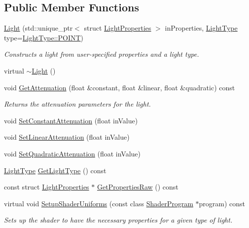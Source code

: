\subsection*{Public Member Functions}
\begin{DoxyCompactItemize}
\item
\hyperlink{class_light_adca12f0d5470bc3f2e6e77233ab3dcf1}{Light} (std\+::unique\+\_\+ptr$<$ struct \hyperlink{struct_light_properties}{Light\+Properties} $>$ in\+Properties, \hyperlink{class_light_a661d9480e01af8b1612860b9630ef5f8}{Light\+Type} type=\hyperlink{class_light_a661d9480e01af8b1612860b9630ef5f8aaebdbcb765394d25d6a604589a890f82}{Light\+Type\+::\+P\+O\+I\+NT})
\begin{DoxyCompactList}\small\item\em Constructs a light from user-\/specified properties and a light type. \end{DoxyCompactList}\item
virtual \hyperlink{class_light_ad0e59fad13bb6cfadc25b2c477e9ddc7}{$\sim$\+Light} ()
\item
void \hyperlink{class_light_acd1a8b84fbcc1ef2dc8b3bc5ecf76c7b}{Get\+Attenuation} (float \&constant, float \&linear, float \&quadratic) const
\begin{DoxyCompactList}\small\item\em Returns the attenuation parameters for the light. \end{DoxyCompactList}\item
void \hyperlink{class_light_aec7f3864e328bc9fada51fdb3e8a7c8e}{Set\+Constant\+Attenuation} (float in\+Value)
\item
void \hyperlink{class_light_aa33086ed4bff3ac95c700698b3070108}{Set\+Linear\+Attenuation} (float in\+Value)
\item
void \hyperlink{class_light_a413e0445d66742c666114dd74d689fc6}{Set\+Quadratic\+Attenuation} (float in\+Value)
\item
\hyperlink{class_light_a661d9480e01af8b1612860b9630ef5f8}{Light\+Type} \hyperlink{class_light_aaa0ba2164adcab55ed7bc1f957fa1f75}{Get\+Light\+Type} () const
\item
const struct \hyperlink{struct_light_properties}{Light\+Properties} $\ast$ \hyperlink{class_light_a1d2283dacdef30df671d55b7dc415851}{Get\+Properties\+Raw} () const
\item
virtual void \hyperlink{class_light_adb3750e44ae24fefa1f4c89f933b2677}{Setup\+Shader\+Uniforms} (const class \hyperlink{class_shader_program}{Shader\+Program} $\ast$program) const
\begin{DoxyCompactList}\small\item\em Sets up the shader to have the necessary properties for a given type of light. \end{DoxyCompactList}\end{DoxyCompactItemize}
